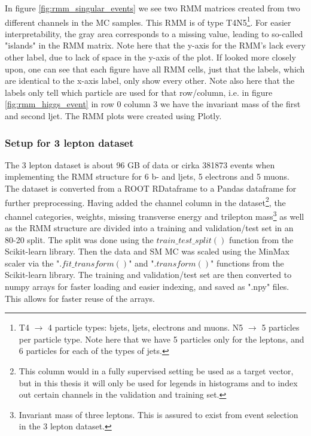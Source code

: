 In figure \ref{fig:rmm_singular_events} we see two RMM matrices created from two different channels in the MC samples. 
This RMM is of type T4N5\footnote{T4 $\to$ 4 particle types: bjets, ljets, electrons and muons. N5 $\to$ 5 particles per 
particle type. Note here that we have 5 particles only for the leptons, and 6 particles for each of the types of jets.}. 
 For easier interpretability, the gray area corresponds to a missing value, leading to so-called "islands" in the RMM matrix.
 Note here that the y-axis for the RMM's lack every other label, due to lack of space in the y-axis of the plot. If looked more closely upon, one can see that 
 each figure have all RMM cells, just that the labels, which are identical to the x-axis label, only show every other. Note also here that the labels only tell which particle are used for that row/column, i.e. 
 in figure \ref{fig:rmm_higgs_event} in row 0 column 3 we have the invariant mass of the first and second ljet. The RMM plots were created using 
 Plotly\cite{plotly}.


\subsubsection*{Setup for 3 lepton dataset}
The 3 lepton dataset is about 96 GB of data or cirka 381873 events when implementing the RMM structure for 6 b- and ljets, 5 electrons and 5 muons. The dataset 
is converted from a ROOT RDataframe to a Pandas dataframe\cite{reback2020pandas} for further preprocessing. Having added the channel column in 
the dataset\footnote{This column would in a fully supervised setting be used as a target vector, but in this thesis it will only be used for legends in
histograms and to index out certain channels in the validation and training set. }, the channel categories, weights, missing transverse energy and 
trilepton mass\footnote{Invariant mass of three leptons. This is assured to exist from event selection in the 3 lepton dataset.} as well as the RMM structure are divided into 
a training and validation/test set in an 80-20 split. The split was done using the $train\_test\_split()$ function from the Scikit-learn library\cite{scikit-learn}.
Then the data and SM MC was scaled using the MinMax scaler via the "$.fit\_transform()$" and "$.transform()$" functions from the 
Scikit-learn library. The training and validation/test set are then converted to numpy arrays\cite{harris2020array} for faster 
loading and easier indexing, and saved as ".npy" files. This allows for faster reuse of the arrays. 

